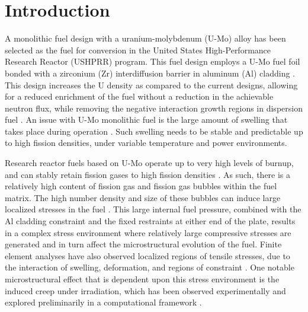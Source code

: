 \documentclass[review]{elsarticle}
\begin{document}
\section{Introduction}\label{sec1}

A monolithic fuel design with a uranium-molybdenum (U-Mo) alloy has been selected as the fuel for conversion in the United States High-Performance Research Reactor (USHPRR) program. This fuel design employs a U-Mo fuel foil bonded with a zirconium (Zr) interdiffusion barrier in aluminum (Al) cladding \cite{umo_qual_plan,meyer2014}. This design increases the U density as compared to the current designs, allowing for a reduced enrichment of the fuel without a reduction in the achievable neutron flux, while removing the negative interaction growth regions in dispersion fuel \cite{ryu2014}. An issue with U-Mo monolithic fuel is the large amount of swelling that takes place during operation \cite{robinson2021}. Such swelling needs to be stable and predictable up to high fission densities, under variable temperature and power environments.

Research reactor fuels based on U-Mo operate up to very high levels of burnup, and can stably retain fission gases to high fission densities \cite{smith2023,gan2015,smith2022}. As such, there is a relatively high content of fission gas and fission gas bubbles within the fuel matrix. The high number density and size of these bubbles can induce large localized stresses in the fuel \cite{hu2021,jian2019}. This large internal fuel pressure, combined with the Al cladding constraint and the fixed restraints at either end of the plate, results in a complex stress environment where relatively large compressive stresses are generated and in turn affect the microstructural evolution of the fuel. Finite element analyses have also observed localized regions of tensile stresses, due to the interaction of swelling, deformation, and regions of constraint \cite{ozaltun2023}. One notable microstructural effect that is dependent upon this stress environment is the induced creep under irradiation, which has been observed experimentally \cite{kim2013} and explored preliminarily in a computational framework \cite{xmiao2021, jian2019}. 
\end{document}
